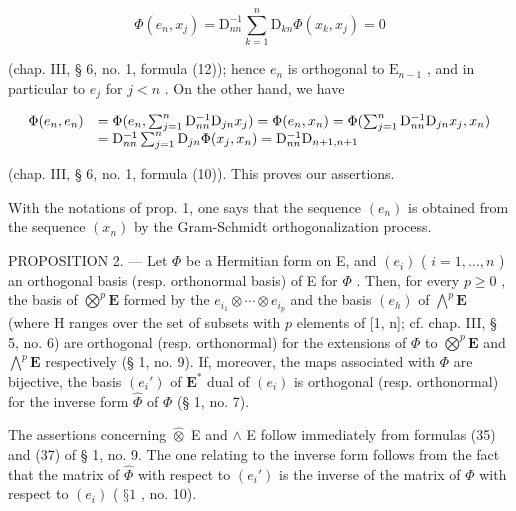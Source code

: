 \[
\Phi (e _ {n}, x _ {j}) = \mathrm{D} _ {n n} ^ {- 1} \sum_ {k = 1} ^ {n} \mathrm{D} _ {k n} \Phi (x _ {k}, x _ {j}) = 0
\]

(chap. III, § 6, no. 1, formula (12)); hence \(e_n\) is orthogonal to \(\mathrm{E}_{n-1}\) , and in particular to \(e_j\) for \(j < n\) . On the other hand, we have

\[
\begin{array}{r l} \Phi (e _ {n}, e _ {n}) & = \Phi (e _ {n}, \sum_ {j = 1} ^ {n} \mathrm{D} _ {n n} ^ {- 1} \mathrm{D} _ {j n} x _ {j}) = \Phi (e _ {n}, x _ {n}) = \Phi (\sum_ {j = 1} ^ {n} \mathrm{D} _ {n n} ^ {- 1} \mathrm{D} _ {j n} x _ {j}, x _ {n}) \\ & = \mathrm{D} _ {n n} ^ {- 1} \sum_ {j = 1} ^ {n} \mathrm{D} _ {j n} \Phi (x _ {j}, x _ {n}) = \mathrm{D} _ {n n} ^ {- 1} \mathrm{D} _ {n + 1, n + 1} \end{array}
\]

(chap. III, § 6, no. 1, formula (10)). This proves our assertions.

With the notations of prop. 1, one says that the sequence \((e_n)\) is obtained from the sequence \((x_n)\) by the Gram-Schmidt orthogonalization process.

PROPOSITION 2. --- Let \(\Phi\) be a Hermitian form on E, and \((e_i)\) ( \(i = 1, \ldots, n\) ) an orthogonal basis (resp. orthonormal basis) of E for \(\Phi\) . Then, for every \(p \geqslant 0\) , the basis of \(\bigotimes^{p} \mathbf{E}\) formed by the \(e_{i_1} \otimes \cdots \otimes e_{i_p}\) and the basis \((e_h)\) of \(\bigwedge^{p} \mathbf{E}\) (where H ranges over the set of subsets with \(p\) elements of {[}1, n{]}; cf. chap. III, § 5, no. 6) are orthogonal (resp. orthonormal) for the extensions of \(\Phi\) to \(\bigotimes^{p} \mathbf{E}\) and \(\bigwedge^{p} \mathbf{E}\) respectively (§ 1, no. 9). If, moreover, the maps associated with \(\Phi\) are bijective, the basis \((e_i')\) of \(\mathbf{E}^*\) dual of \((e_i)\) is orthogonal (resp. orthonormal) for the inverse form \(\hat{\Phi}\) of \(\Phi\) (§ 1, no. 7).

The assertions concerning \(\widehat{\otimes}\) E and \(\wedge\) E follow immediately from formulas (35) and (37) of § 1, no. 9. The one relating to the inverse form follows from the fact that the matrix of \(\widehat{\Phi}\) with respect to \((e_i')\) is the inverse of the matrix of \(\Phi\) with respect to \((e_i)\) ( \(§ 1\) , no. 10).

